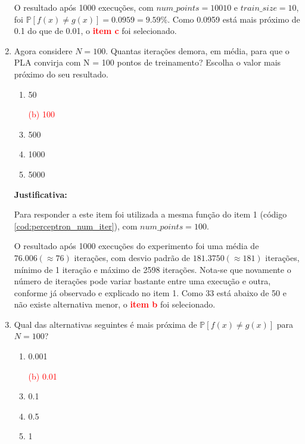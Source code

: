 \begin{enumerate}
    O resultado após 1000 execuções, com $num\_points = 10010$ e $train\_size = 10$, foi  $\mathbb{P}[f(x) \neq g(x)] = 0.0959 = 9.59\%$. Como 0.0959 está mais próximo de 0.1 do que de 0.01, o \textcolor{red}{\textbf{item c}} foi selecionado. 

    \item Agora considere $N = 100$. Quantas iterações demora, em média, para que o PLA convirja com
    N = 100 pontos de treinamento? Escolha o valor mais próximo do seu resultado.

    \begin{enumerate}
        \item 50
        \item[\textcolor{red}{(b)}]\textcolor{red}{100}\addtocounter{enumii}{1}
        \item 500 
        \item 1000
        \item 5000
    \end{enumerate}
     
    \par

    \textbf{Justificativa:}

    Para responder a este item foi utilizada a mesma função do item 1 (código \ref{cod:perceptron_num_iter}), com $num\_points = 100$. 
    
    O resultado após 1000 execuções do experimento foi uma média de $76.006 (\approx 76)$ iterações, com desvio padrão de $181.3750 (\approx 181)$ iterações, mínimo de 1 iteração e máximo de 2598 iterações. Nota-se que novamente o número de iterações pode variar bastante entre uma execução e outra, conforme já observado e explicado no item 1. Como 33 está abaixo de 50 e não existe alternativa menor, o \textcolor{red}{\textbf{item b}} foi selecionado. 
     

    \item Qual das alternativas seguintes é mais próxima de $\mathbb{P}[f(x) \neq g(x)]$ para $N = 100$?
    
    \begin{enumerate}
        \item 0.001
        \item[\textcolor{red}{(b)}]\textcolor{red}{0.01}\addtocounter{enumii}{1}
        \item 0.1
        \item 0.5
        \item 1
    \end{enumerate}


\end{enumerate}
